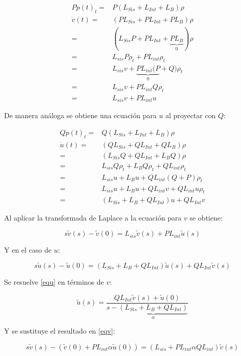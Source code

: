 \documentclass[a4paper,10pt]{report}
\begin{document}
\begin{align*}
P\dot{p}(t)_t =& P(L_{Sis}+L_{Int}+L_B)\rho \\
 \dot{v}(t) =& (PL_{Sis}+PL_{Int}+PL_B)\rho \\
 =&(L_{Sis}P+PL_{Int}+\underbrace{PL_B}_0)\rho \\
 =& L_{sis}P\rho_t + PL_{int}\rho_t \\
 =& L_{sis}v + \underbrace{PL_{int}(P}_0+Q)\rho_t \\
 =& L_{sis}v + PL_{int}Q\rho_t \\
 =& L_{sis}v + PL_{int}u 
\end{align*}

De manera análoga se obtiene una ecuación para $u$ al proyectar con $Q$:

\begin{align*}
Q\dot{p}(t)_t =& Q(L_{Sis}+L_{Int}+L_B)\rho \\
 \dot{u}(t) =& (QL_{Sis}+QL_{Int}+QL_B)\rho \\
 =&(L_{Sis}Q+QL_{Int}+L_BQ)\rho \\
 =& L_{sis}Q\rho_t + L_{B}Q\rho_t + QL_{int}\rho_t \\
 =& L_{sis}u + L_{B}u + QL_{int}(Q+P)\rho_t  \\
 =& L_{sis}u + L_{B}u + QL_{int}v+QL_{int}u\rho_t \\
 =& (L_{Sis}+L_B+QL_{Int})u +QL_{Int}v 
\end{align*}

Al aplicar la transformada de Laplace a la ecuación para $v$ se obtiene:

\begin{equation}\label{eqv}
s\tilde{v}(s)-\tilde{v}(0) = L_{sis}\tilde{v}(s) + PL_{int}\tilde{u}(s)
\end{equation}

Y en el caso de $u$:

\begin{equation}\label{equ}
s\tilde{u}(s)-\tilde{u}(0) = (L_{Sis}+L_B+QL_{Int})\tilde{u}(s) + QL_{Int}\tilde{v}(s)
\end{equation}

Se resuelve \eqref{equ} en términos de $v$:

\begin{equation}
\tilde{u}(s)=\frac{QL_{Int}\tilde{v}(s)+\tilde{u}(0)}{s-\underbrace{(L_{Sis}+L_B+QL_{Int})}_\alpha}
\end{equation}

Y se sustituye el resultado en \eqref{eqv}:

\begin{equation}
s\tilde{v}(s)-(\tilde{v}(0)+PL_{int}\alpha\tilde{u}(0))=(L_{sis}+PL_{int}\alpha QL_{int})\tilde{v}(s)
\end{equation}
\end{document}
